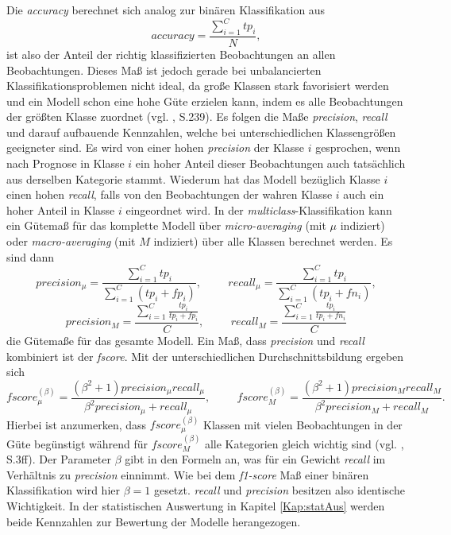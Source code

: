 \documentclass[a4paper,11pt]{article}
\begin{document}
Die \textit{accuracy} berechnet sich analog zur binären Klassifikation aus 
\[ accuracy = \frac{\sum_{i=1}^C tp_i}{N},  \]
ist also der Anteil der richtig klassifizierten Beobachtungen an allen Beobachtungen. Dieses Maß ist jedoch gerade bei unbalancierten Klassifikationsproblemen nicht ideal, da große Klassen stark favorisiert werden und ein Modell schon eine hohe Güte erzielen kann, indem es alle Beobachtungen der größten Klasse zuordnet (vgl. \cite{backhaus}, S.239). Es folgen die Maße \textit{precision}, \textit{recall} und darauf aufbauende Kennzahlen, welche bei unterschiedlichen Klassengrößen geeigneter sind. Es wird von einer hohen \textit{precision} der Klasse $i$ gesprochen, wenn nach Prognose in Klasse $i$ ein hoher Anteil dieser Beobachtungen auch tatsächlich aus derselben Kategorie stammt. Wiederum hat das Modell bezüglich Klasse $i$ einen hohen \textit{recall}, falls von den Beobachtungen der wahren Klasse $i$ auch ein hoher Anteil in Klasse $i$ eingeordnet wird.
In der \textit{multiclass}-Klassifikation kann ein Gütemaß für das komplette Modell über \textit{micro-averaging} (mit $\mu$ indiziert) oder \textit{macro-averaging} (mit $M$ indiziert) über alle Klassen berechnet werden. Es sind dann 
\[ precision_{\mu} = \frac{\sum_{i = 1}^C tp_i}{\sum_{i = 1}^C (tp_i + fp_i)}, \hspace{1cm} recall_{\mu} = \frac{\sum_{i = 1}^C tp_i}{\sum_{i = 1}^C (tp_i + fn_i)},\]
\[ precision_M = \frac{\sum_{i = 1}^C \frac{tp_i}{tp_i + fp_i} }{C}, \hspace{1cm} recall_M = \frac{\sum_{i = 1}^C \frac{tp_i}{tp_i + fn_i} }{C}\]
die Gütemaße für das gesamte Modell. Ein Maß, dass \textit{precision} und \textit{recall} kombiniert ist der \textit{fscore}. Mit der unterschiedlichen Durchschnittsbildung ergeben sich
\[ fscore_{\mu}^{(\beta)} = \frac{(\beta^2+1) precision_{\mu} recall_{\mu}}{\beta^2 precision_{\mu}+ recall_{\mu}}, \hspace{1cm} fscore_{M}^{(\beta)} = \frac{(\beta^2+1) precision_{M} recall_{M}}{\beta^2 precision_{M}+ recall_{M}} . \]
Hierbei ist anzumerken, dass $fscore_{\mu}^{(\beta)}$ Klassen mit vielen Beobachtungen in der Güte begünstigt während für $fscore_M^{(\beta)}$ alle Kategorien gleich wichtig sind  (vgl. \cite{sokolova}, S.3ff). Der Parameter $\beta$ gibt in den Formeln an, was für ein Gewicht \textit{recall} im Verhältnis zu \textit{precision} einnimmt.
Wie bei dem \textit{f1-score} Maß einer binären Klassifikation wird hier $\beta = 1$ gesetzt. \textit{recall} und \textit{precision} besitzen also identische Wichtigkeit. In der statistischen Auswertung in Kapitel \ref{Kap:statAus} werden beide Kennzahlen zur Bewertung der Modelle herangezogen.\\
\end{document}
